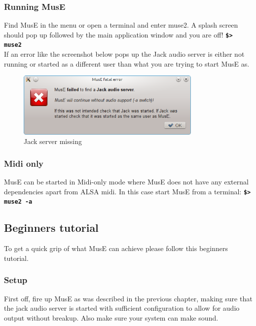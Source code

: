 \documentclass[a4paper]{report}
\newcommand{\shell}[1]{\texttt{\textbf{#1}}}
\newcommand{\screenshotwidth}[0]{0.8\textwidth}
\begin{document}
\subsubsection {Running MusE}
Find MusE in the menu or open a terminal and enter muse2. A splash screen
should pop up followed by the main application window and you are off!
\shell{\$> muse2}\\
If an error like the screenshot below pops up the Jack audio server is
either not running or started as a different user than what you are trying
to start MusE as.
\begin{figure}[htp]
\centering
\includegraphics[width=\screenshotwidth]{pics/no_audio}
\caption{Jack server missing}
\label{fig:no_audio}
\end{figure}
\subsubsection {Midi only}
MusE can be started in Midi-only mode where MusE does not have any external
dependencies apart from ALSA midi. In this case start MusE from a terminal:
\shell{\$> muse2 -a}\\

\subsection {Beginners tutorial}
To get a quick grip of what MusE can achieve please follow this beginners
tutorial.
\subsubsection {Setup}
First off, fire up MusE as was described in the previous chapter, making
sure that the jack audio server is started with sufficient configuration
to allow for audio output without breakup. Also make sure your system can
make sound.
\end{document}
